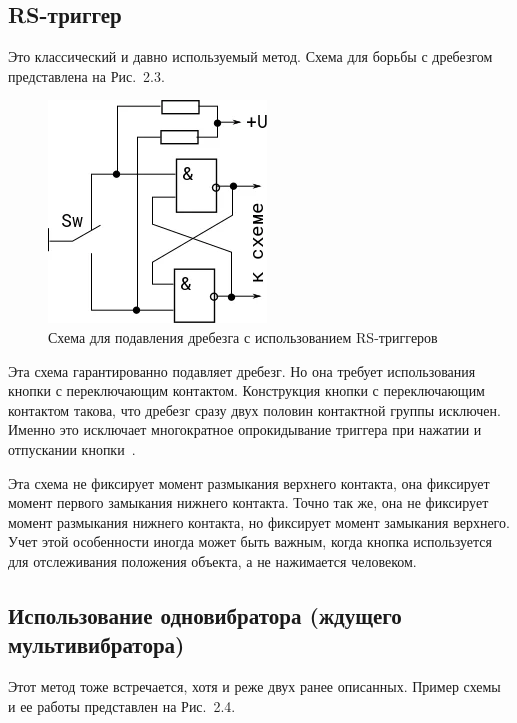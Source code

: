 \documentclass{altsu-report}
\begin{document}
\subsection{RS-триггер}

Это классический и давно используемый метод. Схема для борьбы с дребезгом представлена на Рис.~2.3.

\begin{figure}[H]
    \centering
    \includegraphics[scale=1.5]{RS.png}
    \caption{Схема для подавления дребезга с использованием RS-триггеров}
    \label{fig:rs}
\end{figure}

Эта схема гарантированно подавляет дребезг. Но она требует использования кнопки с переключающим контактом. Конструкция кнопки с переключающим контактом такова, что дребезг сразу двух половин контактной группы исключен. Именно это исключает многократное опрокидывание триггера при нажатии и отпускании кнопки~\cite{dzen}.

Эта схема не фиксирует момент размыкания верхнего контакта, она фиксирует момент первого замыкания нижнего контакта. Точно так же, она не фиксирует момент размыкания нижнего контакта, но фиксирует момент замыкания верхнего. Учет этой особенности иногда может быть важным, когда кнопка используется для отслеживания положения объекта, а не нажимается человеком.

\subsection{Использование одновибратора (ждущего мультивибратора)}

Этот метод тоже встречается, хотя и реже двух ранее описанных. Пример схемы и ее работы представлен на Рис.~2.4.
\end{document}
